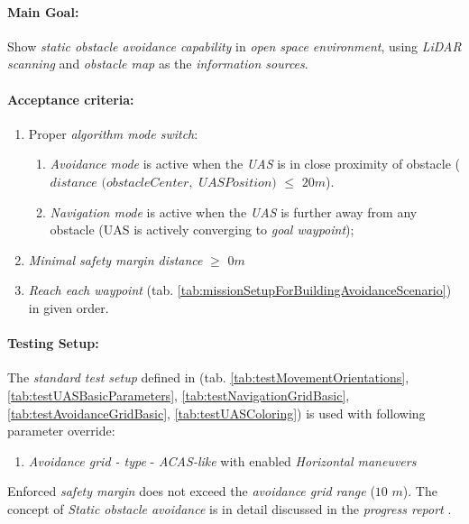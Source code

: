 \noindent \paragraph{Main Goal:} Show \emph{static obstacle avoidance capability} in \emph{open space environment}, using \emph{LiDAR scanning} and \emph{obstacle map} as    the \emph{information sources}. 

\noindent\paragraph{Acceptance criteria:}
\begin{enumerate}
	\item Proper \emph{algorithm mode switch}:
	\begin{enumerate}[a]
		\item \emph{Avoidance mode} is active when the \emph{UAS} is in close proximity of obstacle ($distance$ $(obstacleCenter,$ $UASPosition)$ $\le$ $20m$).
		\item \emph{Navigation mode} is active when the \emph{UAS} is further away from any obstacle (UAS is actively converging to \emph{goal waypoint});
	\end{enumerate}
	
	\item \emph{Minimal safety margin distance} $\ge$ $0 m$
	
	\item \emph{Reach each waypoint} (tab. \ref{tab:missionSetupForBuildingAvoidanceScenario}) in given order.
\end{enumerate}


\noindent\paragraph{Testing Setup:} The \emph{standard test setup} defined in (tab. \ref{tab:testMovementOrientations}, \ref{tab:testUASBasicParameters}, \ref{tab:testNavigationGridBasic}, \ref{tab:testAvoidanceGridBasic}, \ref{tab:testUASColoring}) is used with following parameter override:
\begin{enumerate}
	\item \emph{Avoidance grid - type} - \emph{ACAS-like} with enabled \emph{Horizontal maneuvers}
\end{enumerate}

\begin{note}
	Enforced \emph{safety margin} does not exceed the \emph{avoidance grid range} ($10$ $m$).  The concept of \emph{Static obstacle avoidance} is in detail discussed in the \emph{progress report} \cite{gomola2017probabilistic}.
\end{note}

